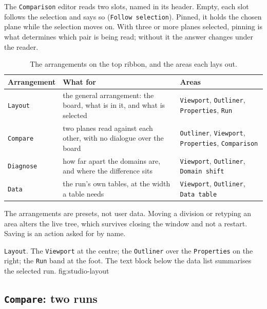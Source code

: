 \documentclass[12pt,a4paper]{article}
\begin{document}
 The \texttt{Comparison}
editor reads two slots, named in its header. Empty, each slot follows the
selection and says so (\texttt{Follow selection}). Pinned, it holds the chosen
plane while the selection moves on. With three or more planes selected, pinning
is what determines which pair is being read; without it the answer changes
under the reader.

\begin{table}[htbp]\centering
\caption{The arrangements on the top ribbon, and the areas each lays out.}
\label{tab:arrangements}
\small
\renewcommand{\arraystretch}{1.18}
\begin{tabular}{@{}L{2.8cm}L{6.3cm}L{6.2cm}@{}}
\toprule
\textbf{Arrangement} & \textbf{What for} & \textbf{Areas} \\
\midrule
\texttt{Layout} & the general arrangement: the board, what is in it, and what is selected & \texttt{Viewport}, \texttt{Outliner}, \texttt{Properties}, \texttt{Run} \\
\texttt{Compare} & two planes read against each other, with no dialogue over the board & \texttt{Outliner}, \texttt{Viewport}, \texttt{Properties}, \texttt{Comparison} \\
\texttt{Diagnose} & how far apart the domains are, and where the difference sits & \texttt{Viewport}, \texttt{Outliner}, \texttt{Domain shift} \\
\texttt{Data} & the run's own tables, at the width a table needs & \texttt{Viewport}, \texttt{Outliner}, \texttt{Data table} \\
\bottomrule
\end{tabular}
\end{table}

The arrangements are presets, not user data. Moving a division or retyping an
area alters the live tree, which survives closing the window and not a restart.
Saving is an action asked for by name.

  {\texttt{Layout}. The \texttt{Viewport} at the centre; the \texttt{Outliner}
   over the \texttt{Properties} on the right; the \texttt{Run} band at the
   foot. The text block below the data list summarises the selected run.}
  {fig:studio-layout}

\subsection{\texttt{Compare}: two runs}
\end{document}
